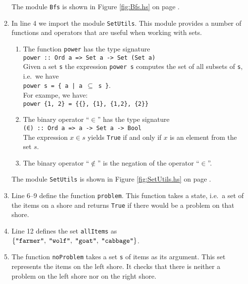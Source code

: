 \begin{enumerate}
            The module \texttt{Bfs} is shown in Figure \ref{fig:Bfs.hs} on page
            \pageref{fig:Bfs.hs}. 
      \item In line 4 we import the module \texttt{SetUtils}.  This module provides a number of functions and
            operators that are useful when working with sets.
            \begin{enumerate}
            \item The function \texttt{power} has the type signature
                  \\[0.2cm]
                  \hspace*{1.3cm}
                  \texttt{power :: Ord a => Set a -> Set (Set a)}
                  \\[0.2cm]
                  Given a set \texttt{s} the expression \texttt{power s} computes the set of all subsets of
                  \texttt{s}, i.e.~we have
                  \\[-0.2cm]
                  \hspace*{1.3cm}
                  \texttt{power s = \{ a \;|\; a $\subseteq$ s \}}.
                  \\[0.2cm]
                  For exampe, we have:
                  \\[0.2cm]
                  \hspace*{1.3cm}
                  \texttt{power \{1, 2\} = \{\{\}, \{1\}, \{1,2\}, \{2\}\}}
            \item The binary operator ``$\in$'' has the type signature
                  \\[0.2cm]
                  \hspace*{1.3cm}
                  \texttt{(∈) :: Ord a => a -> Set a -> Bool}
                  \\[0.2cm]
                  The expression $x \in s$ yields \texttt{True} if and only if $x$ is an element from the set $s$.
            \item The binary operator ``$\not\in$'' is the negation of the operator ``$\in$''.
            \end{enumerate}
            The module \texttt{SetUtils} is shown in Figure \ref{fig:SetUtils.hs} on page \pageref{fig:SetUtils.hs}.
      \item Line 6--9 define the function \texttt{problem}.  This function takes a state, i.e.~a set of the
            items on a shore and returns \texttt{True} if there would be a problem on that shore.
      \item Line 12 defines the set \texttt{allItems} as
            \\[0.2cm]
            \hspace*{1.3cm}
            $\{ \squote{farmer},\; \squote{wolf},\; \squote{goat},\; \squote{cabbage} \}$.
      \item The function \texttt{noProblem} takes a set \texttt{s} of items as its argument.  This set represents
            the items on the left shore.  It checks that there is neither a problem on the left shore nor on
            the right shore.


\end{enumerate}
